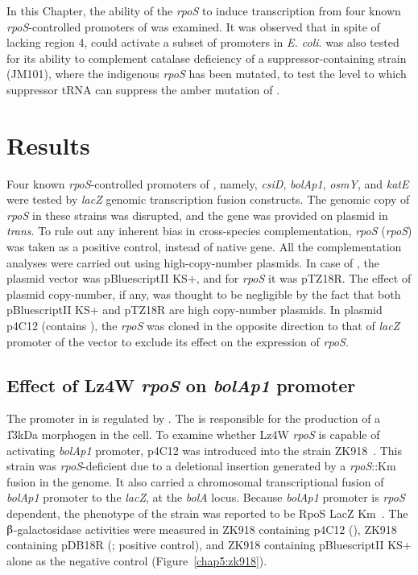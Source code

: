 In this Chapter, the ability of the \emph{rpoS} to
induce transcription from four known \emph{rpoS}-controlled
promoters of  was examined. It was observed that \lzsig{}
in spite of lacking region 4, could activate a subset of promoters
in \emph{E. coli}. \lzsig{} was also tested for its ability to
complement catalase deficiency of a suppressor-containing
 strain (JM101), where the indigenous \emph{rpoS} has
been mutated, to test the level to which suppressor tRNA can
suppress the amber mutation of \lzsig{}.

\section{Results}

Four known \emph{rpoS}-controlled promoters of , namely,
\emph{csiD}, \emph{bolAp1}, \emph{osmY}, and \emph{katE} were
tested by \emph{lacZ} genomic transcription fusion constructs. The
genomic copy of \emph{rpoS} in these strains was disrupted, and
the gene was provided on plasmid in \emph{trans}. To rule out any
inherent bias in cross-species complementation, 
\emph{rpoS} (\emph{rpoS}) was taken as a positive control,
instead of native  gene. All the complementation analyses
were carried out using high-copy-number plasmids. In case of
\lzsig{}, the plasmid vector was pBluescriptII KS+, and for
\emph{rpoS} it was pTZ18R. The effect of plasmid
copy-number, if any, was thought to be negligible by the fact that
both pBluescriptII KS+ and pTZ18R are high copy-number plasmids.
In plasmid p4C12 (contains \lzsig), the \emph{rpoS} was cloned in
the opposite direction to that of \emph{lacZ} promoter of the
vector to exclude its effect on the expression of \emph{rpoS}.


\subsection{Effect of Lz4W \emph{rpoS} on \emph{bolAp1}
promoter}

The  promoter in  is regulated by . The
is responsible for the production of a \U{13}{kDa} morphogen in
the cell. To examine whether Lz4W \emph{rpoS} is capable of
activating  \emph{bolAp1} promoter, p4C12 was introduced
into the strain ZK918~\citep[kind gift from R. Kolter. See
Table~\ref{ecolistrains} on page \pageref{ecolistrains} for
genotype]{Bohannon1991}. This strain was \emph{rpoS}-deficient due
to a deletional insertion generated by a \emph{rpoS}::Km fusion in
the genome. It also carried a chromosomal transcriptional fusion
of \emph{bolAp1} promoter to the \emph{lacZ}, at the \emph{bolA}
locus. Because \emph{bolAp1} promoter is \emph{rpoS} dependent,
the phenotype of the strain was reported to be RpoS\su{$-$}
LacZ\su{$-$} Km~\citep{Bohannon1991,Ramos1998}. The
$\betaup$-galactosidase activities were measured in ZK918
containing p4C12 (\lzsig{}), ZK918 containing pDB18R (\pasig{};
positive control), and ZK918 containing pBluescriptII KS+ alone as
the negative control (Figure~\ref{chap5:zk918}).

